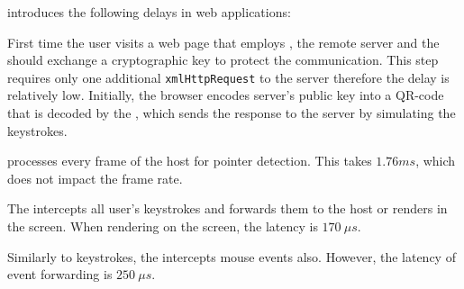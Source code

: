 \name introduces the following delays in web applications:

 First time the user visits a web page that employs \name, the remote server and the \device should exchange a cryptographic key to protect the communication. This step requires only one additional \texttt{xmlHttpRequest} to the server therefore the delay is relatively low. Initially, the browser encodes server's public key into a QR-code that is decoded by the \device, which sends the response to the server by simulating the keystrokes.

 \device processes every frame of the host for pointer detection. This takes $1.76 ms$, which does not impact the frame rate.

 The \device intercepts all user's keystrokes and forwards them to the host or renders in the screen. When rendering on the screen, the latency is $170\ \mu s$.

 Similarly to keystrokes, the \device intercepts mouse events also. However, the latency of event forwarding is $250\ \mu s$.


